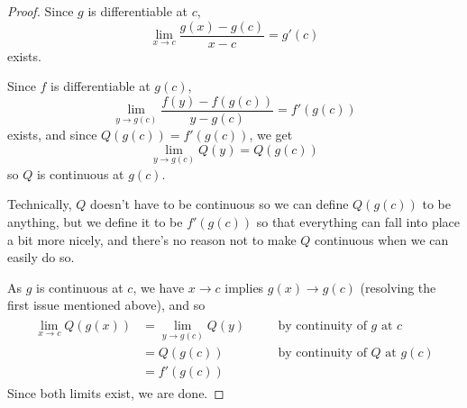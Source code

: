 \begin{proof}
  Since $g$ is differentiable at $c$,
  \[
    \lim_{x \to c} \frac{g(x) - g(c)}{x - c} = g'(c)
  \]
  exists.

  Since $f$ is differentiable at $g(c)$,
  \[
    \lim_{y \to g(c)} \frac{f(y) - f(g(c))}{y - g(c)} = f'(g(c))
  \]
  exists, and since $Q(g(c)) = f'(g(c))$, we get 
  \[
    \lim_{y \to g(c)} Q(y) = Q(g(c))
  \]
  so $Q$ is continuous at $g(c)$.
  \begin{remark}
    Technically, $Q$ doesn't have to be continuous so we can define $Q(g(c))$ to be anything, but we define it to be $f'(g(c))$ so that everything can fall into place a bit more nicely, and there's no reason not to make $Q$ continuous when we can easily do so.
  \end{remark}
  As $g$ is continuous at $c$, we have $x \to c$ implies $g(x) \to g(c)$ (resolving the first issue mentioned above), and so
  \begin{align*}
    \begin{aligned}
      \lim_{x \to c} Q(g(x)) &= \lim_{y \to g(c)} Q(y) &&\quad \text{by continuity of $g$ at $c$} \\ 
      &= Q(g(c)) &&\quad \text{by continuity of $Q$ at $g(c)$} \\
      &= f'(g(c))
    \end{aligned}
  \end{align*}
  Since both limits exist, we are done.
\end{proof}


